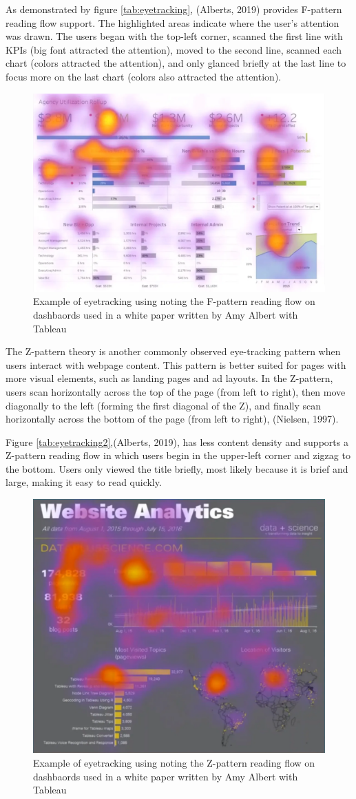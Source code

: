 \documentclass[print]{nuthesis}
\begin{document}
As demonstrated by figure \ref{tab:eyetracking}, (Alberts, 2019) provides F-pattern reading flow support.
The highlighted areas indicate where the user's attention was drawn.
The users began with the top-left corner, scanned the first line with KPIs (big font attracted the attention), moved to the second line, scanned each chart (colors attracted the attention), and only glanced briefly at the last line to focus more on the last chart (colors also attracted the attention).

\begin{figure}

{\centering \includegraphics[width=0.45\linewidth]{figure/eyetracking_dashboards_f_pattern} 

}

\caption{Example of eyetracking using noting the F-pattern reading flow on dashbaords used in a white paper written by Amy Albert with Tableau}\label{fig:eyetracking}
\end{figure}

The Z-pattern theory is another commonly observed eye-tracking pattern when users interact with webpage content.
This pattern is better suited for pages with more visual elements, such as landing pages and ad layouts.
In the Z-pattern, users scan horizontally across the top of the page (from left to right), then move diagonally to the left (forming the first diagonal of the Z), and finally scan horizontally across the bottom of the page (from left to right), (Nielsen, 1997).

Figure \ref{tab:eyetracking2},(Alberts, 2019), has less content density and supports a Z-pattern reading flow in which users begin in the upper-left corner and zigzag to the bottom.
Users only viewed the title briefly, most likely because it is brief and large, making it easy to read quickly.

\begin{figure}

{\centering \includegraphics[width=0.45\linewidth]{figure/eyetracking_dashboards_z_pattern} 

}

\caption{Example of eyetracking using noting the Z-pattern reading flow on dashbaords used in a white paper written by Amy Albert with Tableau}\label{fig:eyetracking2}
\end{figure}
\end{document}
